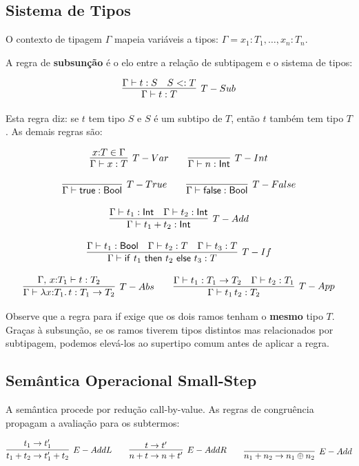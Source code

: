 \subsection{Sistema de Tipos}

O contexto de tipagem \(\Gamma\) mapeia variáveis a tipos:
\(\Gamma = x_1 {:} T_1, \ldots, x_n {:} T_n\).

A regra de \textbf{subsunção} é o elo entre a relação de subtipagem e
o sistema de tipos:

\[ \infer[T-Sub]{\Gamma \vdash t : T}{\Gamma \vdash t : S \quad S <: T} \]

Esta regra diz: se \(t\) tem tipo \(S\) e \(S\) é um subtipo de
\(T\), então \(t\) também tem tipo \(T\). As demais regras são:

\[ \infer[T-Var]{\Gamma \vdash x : T}{x {:} T \in \Gamma} \qquad
\infer[T-Int]{\Gamma \vdash n : \mathsf{Int}}{} \]

\[ \infer[T-True]{\Gamma \vdash \mathsf{true} : \mathsf{Bool}}{} \qquad
\infer[T-False]{\Gamma \vdash \mathsf{false} : \mathsf{Bool}}{} \]

\[ \infer[T-Add]{\Gamma \vdash t_1 + t_2 : \mathsf{Int}}{\Gamma \vdash t_1 :
\mathsf{Int} \quad \Gamma \vdash t_2 : \mathsf{Int}} \]

\[ \infer[T-If]{\Gamma \vdash \mathsf{if}\ t_1\ \mathsf{then}\ t_2\
  \mathsf{else}\ t_3 : T}{\Gamma \vdash t_1 : \mathsf{Bool} \quad \Gamma \vdash
t_2 : T \quad \Gamma \vdash t_3 : T} \]

\[ \infer[T-Abs]{\Gamma \vdash \lambda x {:} T_1.\, t : T_1 \to T_2}{\Gamma,\,
  x {:} T_1 \vdash t : T_2} \qquad \infer[T-App]{\Gamma \vdash t_1\, t_2 :
T_2}{\Gamma \vdash t_1 : T_1 \to T_2 \quad \Gamma \vdash t_2 : T_1} \]

Observe que a regra para if exige que os dois ramos tenham o
\textbf{mesmo} tipo \(T\). Graças à subsunção, se os ramos tiverem
tipos distintos mas relacionados por subtipagem, podemos elevá-los ao
supertipo comum antes de aplicar a regra.

\subsection{Semântica Operacional Small-Step}

A semântica procede por redução call-by-value. As regras de
congruência propagam a avaliação para os subtermos:

\[ \infer[E-AddL]{t_1 + t_2 \to t_1' + t_2}{t_1 \to t_1'} \qquad
  \infer[E-AddR]{n + t \to n + t'}{t \to t'} \qquad \infer[E-Add]{n_1 + n_2 \to
n_1 \oplus n_2}{} \]

